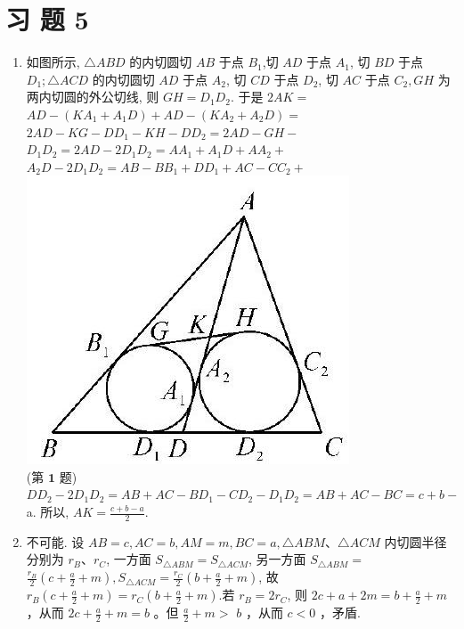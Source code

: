 \documentclass[10pt]{article}
\begin{document}
\section*{习 题 5}
\begin{enumerate}
  \item 如图所示, $\triangle A B D$ 的内切圆切 $A B$ 于点 $B_{1}$,切 $A D$ 于点 $A_{1}$, 切 $B D$ 于点 $D_{1} ; \triangle A C D$ 的内切圆切 $A D$ 于点 $A_{2}$, 切 $C D$ 于点 $D_{2}$, 切 $A C$ 于点 $C_{2}, G H$ 为两内切圆的外公切线, 则 $G H=D_{1} D_{2}$. 于是 $2 A K=$ $A D-\left(K A_{1}+A_{1} D\right)+A D-\left(K A_{2}+A_{2} D\right)=$ $2 A D-K G-D D_{1}-K H-D D_{2}=2 A D-G H-$ $D_{1} D_{2}=2 A D-2 D_{1} D_{2}=A A_{1}+A_{1} D+A A_{2}+$ $A_{2} D-2 D_{1} D_{2}=A B-B B_{1}+D D_{1}+A C-C C_{2}+$\\
\includegraphics[max width=\textwidth, center]{2024_10_30_66b8e5e701da2093c133g-093(3)}\\
(第 $\mathbf{1}$ 题)\\
$D D_{2}-2 D_{1} D_{2}=A B+A C-B D_{1}-C D_{2}-D_{1} D_{2}=A B+A C-B C=c+b-$ a. 所以, $A K=\frac{c+b-a}{2}$.
  \item 不可能. 设 $A B=c, A C=b, A M=m, B C=a, \triangle A B M 、 \triangle A C M$ 内切圆半径分别为 $r_{B} 、 r_{C}$, 一方面 $S_{\triangle A B M}=S_{\triangle A C M}$, 另一方面 $S_{\triangle A B M}=$ $\frac{r_{B}}{2}\left(c+\frac{a}{2}+m\right), S_{\triangle A C M}=\frac{r_{C}}{2}\left(b+\frac{a}{2}+m\right)$, 故 $r_{B}\left(c+\frac{a}{2}+m\right)=r_{C}\left(b+\frac{a}{2}+m\right)$.若 $r_{B}=2 r_{C}$, 则 $2 c+a+2 m=b+\frac{a}{2}+m$ ，从而 $2 c+\frac{a}{2}+m=b$ 。但 $\frac{a}{2}+m>$ $b$ ，从而 $c<0$ ，矛盾.

\end{enumerate}
\end{document}
